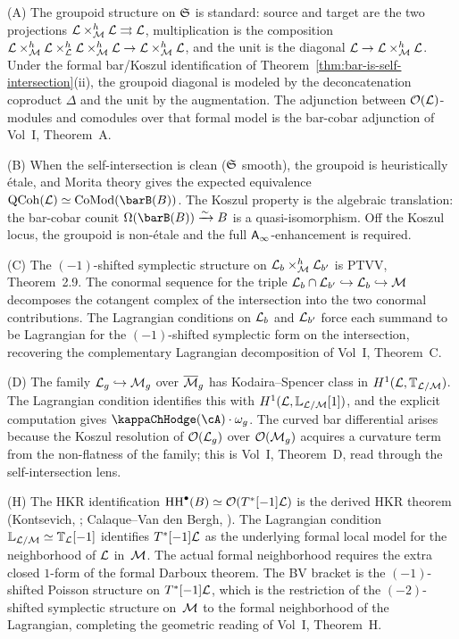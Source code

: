 \begin{remark}[Evidence]
(A) The groupoid structure on $\mathfrak{S}$ is standard: source and
target are the two projections $\mathcal L \times_\mathcal M^h \mathcal L
\rightrightarrows \mathcal L$, multiplication is the composition
$\mathcal L \times_\mathcal M^h \mathcal L \times_\mathcal L^h \mathcal L \times_\mathcal M^h \mathcal L
\to \mathcal L \times_\mathcal M^h \mathcal L$, and the unit is the diagonal
$\mathcal L \to \mathcal L \times_\mathcal M^h \mathcal L$. Under the formal bar/Koszul
identification of Theorem~\ref{thm:bar-is-self-intersection}(ii),
the groupoid diagonal is modeled by the deconcatenation coproduct
$\Delta$ and the unit by the augmentation. The adjunction between
$\mathcal O(\mathcal L)$-modules and comodules over that formal model is the
bar-cobar adjunction of Vol~I, Theorem~A\@.

(B) When the self-intersection is clean ($\mathfrak{S}$ smooth), the
groupoid is heuristically \'{e}tale, and Morita theory gives the
expected equivalence
$\mathrm{QCoh}(\cL) \simeq \mathrm{CoMod}(\barB(B))$. The
Koszul property is the algebraic translation: the bar-cobar
counit $\Omega(\barB(B)) \xrightarrow{\sim} B$ is a
quasi-isomorphism. Off the Koszul locus, the groupoid is
non-\'{e}tale and the full $\mathsf{A}_{\infty}$-enhancement is required.

(C) The $(-1)$-shifted symplectic structure on
$\mathcal L_b \times_\mathcal M^h \mathcal L_{b'}$ is PTVV, Theorem~2.9. The
conormal sequence for the triple $\mathcal L_b \cap \mathcal L_{b'}
\hookrightarrow \mathcal L_b \hookrightarrow \mathcal M$ decomposes the
cotangent complex of the intersection into the two conormal
contributions. The Lagrangian conditions on $\mathcal L_b$ and
$\mathcal L_{b'}$ force each summand to be Lagrangian for the
$(-1)$-shifted symplectic form on the intersection, recovering
the complementary Lagrangian decomposition of Vol~I, Theorem~C\@.

(D) The family $\mathcal L_g \hookrightarrow \mathcal M_g$ over
$\overline{\mathcal M}_g$ has Kodaira--Spencer class in
$H^1(\mathcal L, \mathbb{T}_{\mathcal L/\mathcal M})$. The Lagrangian condition
identifies this with $H^1(\mathcal L, \mathbb{L}_{\mathcal L/\mathcal M}[1])$, and
the explicit computation gives $\kappaChHodge(\cA) \cdot \omega_g$.
The curved bar differential arises because the Koszul resolution
of $\mathcal O(\mathcal L_g)$ over $\mathcal O(\mathcal M_g)$ acquires a curvature term
from the non-flatness of the family; this is Vol~I, Theorem~D,
read through the self-intersection lens.

(H) The HKR identification $\operatorname{HH}^\bullet(B) \simeq
\mathcal O(T^*[-1]\mathcal L)$ is the derived HKR theorem
(Kontsevich, \cite{Kon03}; Calaque--Van den Bergh, \cite{CVdB10}).
The Lagrangian condition $\mathbb{L}_{\mathcal L/\mathcal M} \simeq
\mathbb{T}_\mathcal L[-1]$ identifies $T^*[-1]\mathcal L$ as the underlying
formal local model for the neighborhood of $\mathcal L$ in~$\mathcal M$. The
actual formal neighborhood requires the extra closed $1$-form of
the formal Darboux theorem. The BV bracket is the $(-1)$-shifted Poisson
structure on $T^*[-1]\mathcal L$, which is the restriction of the
$(-2)$-shifted symplectic structure on~$\mathcal M$ to the formal
neighborhood of the Lagrangian, completing the geometric
reading of Vol~I, Theorem~H\@.
\end{remark}


